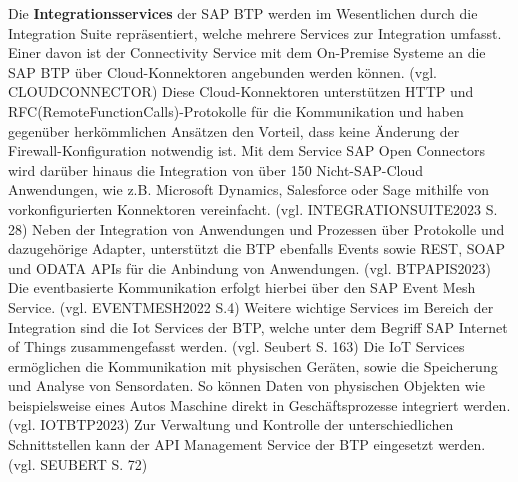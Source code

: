 Die \textbf{Integrationsservices} der SAP BTP werden im Wesentlichen durch die Integration Suite repräsentiert, welche mehrere Services zur Integration umfasst. Einer davon ist der Connectivity Service mit dem On-Premise Systeme an die SAP BTP über Cloud-Konnektoren angebunden werden können. (vgl. CLOUDCONNECTOR) Diese Cloud-Konnektoren unterstützen HTTP und RFC(RemoteFunctionCalls)-Protokolle für die Kommunikation und haben gegenüber herkömmlichen Ansätzen den Vorteil, dass keine Änderung der Firewall-Konfiguration notwendig ist. Mit dem Service SAP Open Connectors wird darüber hinaus die Integration von über 150 Nicht-SAP-Cloud Anwendungen, wie z.B. Microsoft Dynamics, Salesforce oder Sage mithilfe von vorkonfigurierten Konnektoren vereinfacht. (vgl. INTEGRATIONSUITE2023 S. 28) Neben der Integration von Anwendungen und Prozessen über Protokolle und dazugehörige Adapter, unterstützt die BTP ebenfalls Events sowie REST, SOAP und ODATA APIs für die Anbindung von Anwendungen. (vgl. BTPAPIS2023) Die eventbasierte Kommunikation erfolgt hierbei über den SAP Event Mesh Service. (vgl. EVENTMESH2022 S.4) Weitere wichtige Services im Bereich der Integration sind die Iot Services der BTP, welche unter dem Begriff SAP Internet of Things zusammengefasst werden. (vgl. Seubert S. 163) Die IoT Services ermöglichen die Kommunikation mit physischen Geräten, sowie die Speicherung und Analyse von Sensordaten. So können Daten von physischen Objekten wie beispielsweise eines Autos Maschine direkt in Geschäftsprozesse integriert werden.(vgl. IOTBTP2023)  Zur Verwaltung und Kontrolle der unterschiedlichen Schnittstellen kann der API Management Service der BTP eingesetzt werden. (vgl. SEUBERT S. 72)  

